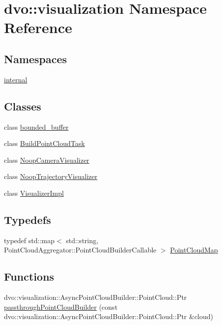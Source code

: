 \hypertarget{namespacedvo_1_1visualization}{}\section{dvo\+:\+:visualization Namespace Reference}
\label{namespacedvo_1_1visualization}
\subsection*{Namespaces}
\begin{DoxyCompactItemize}
\item 
 \mbox{\hyperlink{namespacedvo_1_1visualization_1_1internal}{internal}}
\end{DoxyCompactItemize}
\subsection*{Classes}
\begin{DoxyCompactItemize}
\item 
class \mbox{\hyperlink{classdvo_1_1visualization_1_1bounded__buffer}{bounded\+\_\+buffer}}
\item 
class \mbox{\hyperlink{classdvo_1_1visualization_1_1_build_point_cloud_task}{Build\+Point\+Cloud\+Task}}
\item 
class \mbox{\hyperlink{classdvo_1_1visualization_1_1_noop_camera_visualizer}{Noop\+Camera\+Visualizer}}
\item 
class \mbox{\hyperlink{classdvo_1_1visualization_1_1_noop_trajectory_visualizer}{Noop\+Trajectory\+Visualizer}}
\item 
class \mbox{\hyperlink{classdvo_1_1visualization_1_1_visualizer_impl}{Visualizer\+Impl}}
\end{DoxyCompactItemize}
\subsection*{Typedefs}
\begin{DoxyCompactItemize}
\item 
typedef std\+::map$<$ std\+::string, Point\+Cloud\+Aggregator\+::\+Point\+Cloud\+Builder\+Callable $>$ \mbox{\hyperlink{namespacedvo_1_1visualization_a6bfc209b639de1fc1fb54582af7292f7}{Point\+Cloud\+Map}}
\end{DoxyCompactItemize}
\subsection*{Functions}
\begin{DoxyCompactItemize}
\item 
dvo\+::visualization\+::\+Async\+Point\+Cloud\+Builder\+::\+Point\+Cloud\+::\+Ptr \mbox{\hyperlink{namespacedvo_1_1visualization_a6bc29f6202a53878a0e89d1d50d1f20f}{passthrough\+Point\+Cloud\+Builder}} (const dvo\+::visualization\+::\+Async\+Point\+Cloud\+Builder\+::\+Point\+Cloud\+::\+Ptr \&cloud)
\end{DoxyCompactItemize}


